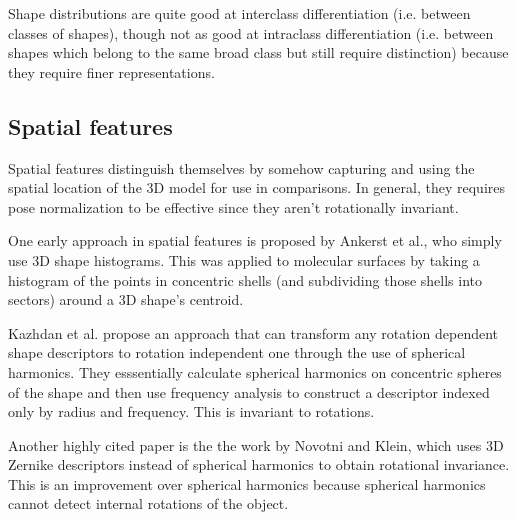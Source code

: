 \documentclass[../tech_report_1.tex]{subfiles}
\begin{document}
Shape distributions are quite good at interclass differentiation (i.e. between classes of shapes), though not as good at intraclass differentiation\cite{tangelder2008survey} (i.e. between shapes which belong to the same broad class but still require distinction) because they require finer representations.

\subsection{Spatial features}

Spatial features distinguish themselves by somehow capturing and using the spatial location of the 3D model for use in comparisons. In general, they requires pose normalization to be effective since they aren't rotationally invariant.

One early approach in spatial features is proposed by Ankerst et al.\cite{ankerst19993d}, who simply use 3D shape histograms. This was applied to molecular surfaces by taking a histogram of the points in concentric shells (and subdividing those shells into sectors) around a 3D shape's centroid.

Kazhdan et al.\cite{kazhdan2003rotation} propose an approach that can transform any rotation dependent shape descriptors to rotation independent one through the use of spherical harmonics. They esssentially calculate spherical harmonics on concentric spheres of the shape and then use frequency analysis to construct a descriptor indexed only by radius and frequency. This is invariant to rotations.

Another highly cited paper is the the work by Novotni and Klein\cite{novotni20033d}, which uses 3D Zernike descriptors instead of spherical harmonics to obtain rotational invariance. This is an improvement over spherical harmonics because spherical harmonics cannot detect internal rotations of the object.
\end{document}
